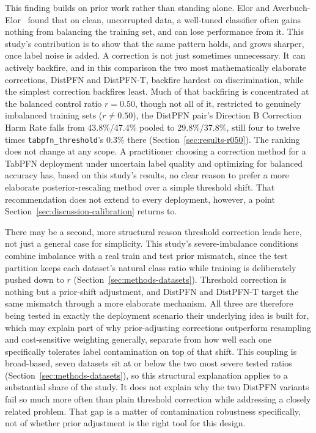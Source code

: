 This finding builds on prior work rather than standing alone. Elor and
Averbuch-Elor~\cite{elor2022smote} found that on clean, uncorrupted data, a
well-tuned classifier often gains nothing from balancing the training set,
and can lose performance from it. This study's contribution is to show
that the same pattern holds, and grows sharper, once label noise is added.
A correction is not just sometimes unnecessary. It can actively backfire,
and in this comparison the two most mathematically elaborate corrections,
DistPFN and DistPFN-T, backfire hardest on discrimination, while the
simplest correction backfires least. Much of that backfiring is
concentrated at the balanced control ratio $r{=}0.50$, though not all of
it, restricted to genuinely imbalanced training sets ($r{\neq}0.50$), the
DistPFN pair's Direction B Correction Harm Rate falls from 43.8\%/47.4\%
pooled to 29.8\%/37.8\%, still four to twelve times
\texttt{tabpfn\_threshold}'s 0.3\% there
(Section~\ref{sec:results-r050}). The ranking does not change at any
scope. A practitioner choosing a correction method for a TabPFN
deployment under uncertain label quality and optimizing for balanced
accuracy has, based on this study's results, no clear reason to prefer a
more elaborate posterior-rescaling method over a simple threshold shift.
That recommendation does not extend to every deployment, however, a point
Section~\ref{sec:discussion-calibration} returns to.

There may be a second, more structural reason threshold correction leads
here, not just a general case for simplicity. This study's
severe-imbalance conditions combine imbalance with a real train and test
prior mismatch, since the test partition keeps each dataset's natural
class ratio while training is deliberately pushed down to $r$
(Section~\ref{sec:methods-datasets}). Threshold correction is nothing but
a prior-shift adjustment, and DistPFN and DistPFN-T target the same
mismatch through a more elaborate mechanism. All three are therefore
being tested in exactly the deployment scenario their underlying idea is
built for, which may explain part of why prior-adjusting corrections
outperform resampling and cost-sensitive weighting generally, separate
from how well each one specifically tolerates label contamination on top
of that shift. This coupling is broad-based, seven datasets sit at or
below the two most severe tested ratios (Section~\ref{sec:methods-datasets}),
so this structural explanation applies to a substantial share of the
study. It does not explain why the two DistPFN variants
fail so much more often than plain threshold correction while addressing
a closely related problem. That gap is a matter of contamination
robustness specifically, not of whether prior adjustment is the right
tool for this design.

